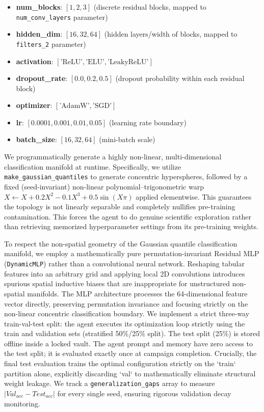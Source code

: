\documentclass[conference]{IEEEtran}
\begin{document}
\begin{itemize}[leftmargin=1.5em,itemsep=1pt]
  \item \textbf{num\_blocks}: $[1, 2, 3]$ (discrete residual blocks, mapped to \texttt{num\_conv\_layers} parameter)
  \item \textbf{hidden\_dim}: $[16, 32, 64]$ (hidden layers/width of blocks, mapped to \texttt{filters\_2} parameter)
  \item \textbf{activation}: $[\text{'ReLU'}, \text{'ELU'}, \text{'LeakyReLU'}]$
  \item \textbf{dropout\_rate}: $[0.0, 0.2, 0.5]$ (dropout probability within each residual block)
  \item \textbf{optimizer}: $[\text{'AdamW'}, \text{'SGD'}]$
  \item \textbf{lr}: $[0.0001, 0.001, 0.01, 0.05]$ (learning rate boundary)
  \item \textbf{batch\_size}: $[16, 32, 64]$ (mini-batch scale)
\end{itemize}

We programmatically generate a highly non-linear, multi-dimensional classification manifold at runtime. Specifically, we utilize \texttt{make\_gaussian\_quantiles} to generate concentric hyperspheres, followed by a fixed (seed-invariant) non-linear polynomial--trigonometric warp $X \leftarrow X + 0.2X^2 - 0.1X^3 + 0.5\sin(X\pi)$ applied elementwise. This guarantees the topology is not linearly separable and completely nullifies pre-training contamination. This forces the agent to do genuine scientific exploration rather than retrieving memorized hyperparameter settings from its pre-training weights. 

To respect the non-spatial geometry of the Gaussian quantile classification manifold, we employ a mathematically pure permutation-invariant Residual MLP (\texttt{DynamicMLP}) rather than a convolutional neural network. Reshaping tabular features into an arbitrary grid and applying local 2D convolutions introduces spurious spatial inductive biases that are inappropriate for unstructured non-spatial manifolds. The MLP architecture processes the 64-dimensional feature vector directly, preserving permutation invariance and focusing strictly on the non-linear concentric classification boundary. We implement a strict three-way train-val-test split: the agent executes its optimization loop strictly using the train and validation sets (stratified 50\%/25\% split). The test split (25\%) is stored offline inside a locked vault. The agent prompt and memory have zero access to the test split; it is evaluated exactly once at campaign completion. Crucially, the final test evaluation trains the optimal configuration strictly on the `train` partition alone, explicitly discarding `val` to mathematically eliminate structural weight leakage. We track a \texttt{generalization\_gaps} array to measure $|Val_{acc} - Test_{acc}|$ for every single seed, ensuring rigorous validation decay monitoring.
\end{document}
